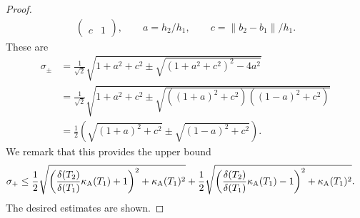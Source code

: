 \documentclass[10pt,a4paper]{article}
\begin{document}
\begin{proof}
\begin{align*}
\begin{pmatrix}
            \\
            c & 1
        \end{pmatrix},
        \qquad 
        a = h_2 / h_1,
        \qquad 
        c = \|b_2-b_1\| / h_1
        .
    \end{align*}
    These are 
    \begin{align*}
        \sigma_{\pm} 
        &
        = 
        \frac{1}{\sqrt{2}} \sqrt{ 1 + a^2 + c^2 \pm \sqrt{ \left( 1 + a^2 + c^2 \right)^{2} - 4a^{2} } } 
        \\&
        =
        \frac{1}{\sqrt{2}} \sqrt{ 1 + a^2 + c^2 \pm \sqrt{ \left( (1+a)^2 + c^2 \right)\left( (1-a)^2 + c^2 \right) } } 
        \\&
        =
        \frac{1}{2} 
        \left( \sqrt{ (1 + a)^2 + c^2 } \pm \sqrt{ (1 - a)^2 + c^2 } \right)
        .
    \end{align*}
    We remark that this provides the upper bound 
    \begin{align*}
        \sigma_{+} 
        &
        \leq 
        \frac{1}{2} 
        \sqrt{ \left( \frac{ {\delta}(T_2) }{ {\delta}(T_1) } \kappa_{\rm A}(T_{1}) + 1 \right)^{2} + \kappa_{\rm A}(T_{1})^{2} }
        +
        \frac{1}{2} 
        \sqrt{ \left( \frac{ {\delta}(T_2) }{ {\delta}(T_1) } \kappa_{\rm A}(T_{1}) - 1 \right)^{2} + \kappa_{\rm A}(T_{1})^{2} }
        .
    \end{align*}
    The desired estimates are shown.

\end{proof}
\end{document}
